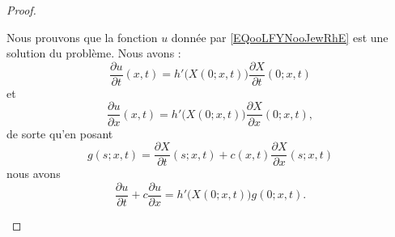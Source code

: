 \begin{proof}
\begin{subproof}
\begin{subproof}
			Nous prouvons que la fonction \( u\) donnée par \eqref{EQooLFYNooJewRhE} est une solution du problème. Nous avons :
			\begin{equation}
				\frac{ \partial u }{ \partial t }(x,t)=h'\big( X(0;x,t) \big)\frac{ \partial X }{ \partial t }(0;x,t)
			\end{equation}
			et
			\begin{equation}
				\frac{ \partial u }{ \partial x }(x,t)=h'\big( X(0;x,t) \big)\frac{ \partial X }{ \partial x }(0;x,t),
			\end{equation}
			de sorte qu'en posant
			\begin{equation}
				g(s;x,t)=\frac{ \partial X }{ \partial t }(s;x,t)+c(x,t)\frac{ \partial X }{ \partial x }(s;x,t)
			\end{equation}
			nous avons
			\begin{equation}
				\frac{ \partial u }{ \partial t }+c\frac{ \partial u }{ \partial x }=h'\big( X(0;x,t) \big)g(0;x,t).
			\end{equation}



\end{subproof}
\end{subproof}
\end{proof}
